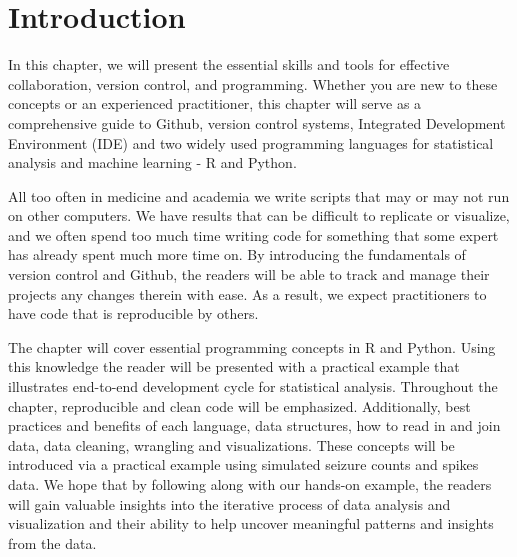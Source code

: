 \section{Introduction}
In this chapter, we will present the essential skills and tools for effective collaboration, version control, and programming. Whether you are new to these concepts or an experienced practitioner, this chapter will serve as a comprehensive guide to Github, version control systems, Integrated Development Environment (IDE) and two widely used programming languages for statistical analysis and machine learning - R and Python.

All too often in medicine and academia we write scripts that may or may not run on other computers. We have results that can be difficult to replicate or visualize, and we often spend too much time writing code for something that some expert has already spent much more time on. By introducing the fundamentals of version control and Github, the readers will be able to track and manage their projects any changes therein with ease. As a result, we expect practitioners to have code that is reproducible by others.

The chapter will cover essential programming concepts in R and Python. Using this knowledge the reader will be presented with a practical example that illustrates end-to-end development cycle for statistical analysis. Throughout the chapter, reproducible and clean code will be emphasized. Additionally, best practices and benefits of each language, data structures, how to read in and join data, data cleaning, wrangling and visualizations. These concepts will be introduced via a practical example using simulated seizure counts and spikes data. We hope that by following along with our hands-on example, the readers will gain valuable insights into the iterative process of data analysis and visualization and their ability to help uncover meaningful patterns and insights from the data.
